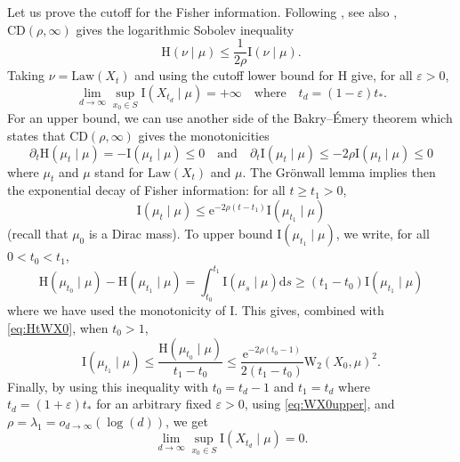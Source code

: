 \documentclass[10pt,reqno]{amsart}
\numberwithin{equation}{section}
\begin{document}
Let us prove the cutoff for the Fisher information.
Following \cite{BE85}, see also \cite{BGL14}, $\mathrm{CD}(\rho,\infty)$ gives the logarithmic Sobolev inequality  
\begin{equation}\label{eq:LSI}
  \mathrm{H}(\nu\mid\mu)\leq\frac{1}{2\rho}\mathrm{I}(\nu\mid\mu).
\end{equation}
Taking $\nu=\mathrm{Law}(X_t)$ and using the cutoff lower bound for $\mathrm{H}$ give, for all $\varepsilon>0$, 
\begin{equation}\label{eq:I:lower}
  \lim_{d\to\infty}\sup_{x_0\in S}\mathrm{I}(X_{t_d}\mid\mu)=+\infty
  \quad\text{where}\quad
  t_d=(1-\varepsilon)t_*.
\end{equation}
For an upper bound, we can use another side of the Bakry--Émery theorem which states that $\mathrm{CD}(\rho,\infty)$ gives the monotonicities
\begin{equation}
  \partial_t\mathrm{H}(\mu_t\mid\mu)=-\mathrm{I}(\mu_t\mid\mu)\leq0
  \quad\text{and}\quad
  \partial_t\mathrm{I}(\mu_t\mid\mu)
  \leq-2\rho\mathrm{I}(\mu_t\mid\mu)\leq0
\end{equation}    
where $\mu_t$ and $\mu$ stand for $\mathrm{Law}(X_t)$ and
$\mu$. The Grönwall lemma implies then the exponential decay of
Fisher information: for all $t\geq t_1>0$,
\begin{equation}\label{eq:expdecI}
  \mathrm{I}(\mu_t\mid\mu)\leq\mathrm{e}^{-2\rho(t-t_1)}\mathrm{I}(\mu_{t_1}\mid\mu)
\end{equation}
(recall that $\mu_0$ is a Dirac mass). To upper bound $\mathrm{I}(\mu_{t_1}\mid\mu)$, we write, for all $0<t_0<t_1$,
\begin{equation}\label{eq:HI}
  \mathrm{H}(\mu_{t_0}\mid\mu)-\mathrm{H}(\mu_{t_1}\mid\mu)
  =\int_{t_0}^{t_1}\mathrm{I}(\mu_s\mid\mu)\mathrm{d}s
  \geq(t_1-t_0)\mathrm{I}(\mu_{t_1}\mid\mu)
\end{equation}
where we have used the monotonicity of $\mathrm{I}$. This gives, combined
with \eqref{eq:HtWX0}, when $t_0>1$,
\begin{equation} \label{eq_fisher_ent_w2}
  \mathrm{I}(\mu_{t_1}\mid\mu)
  \leq\frac{\mathrm{H}(\mu_{t_0}\mid\mu)}{t_1-t_0}
  \leq\frac{\mathrm{e}^{-2\rho(t_0-1)}}{2(t_1-t_0)}\mathrm{W}_2(X_0, \mu)^2.
\end{equation}
Finally, by using this inequality with $t_0=t_d-1$ and $t_1=t_d$ where
$t_d=(1+\varepsilon)t_*$ for an arbitrary fixed $\varepsilon>0$, using
\eqref{eq:WX0upper}, and $\rho=\lambda_1=o_{d\to\infty}(\log(d))$, we get
\begin{equation}\label{eq:I:upper}
  \lim_{d\to\infty}\sup_{x_0\in S}\mathrm{I}(X_{t_d}\mid\mu)=0.
\end{equation}
\end{document}

